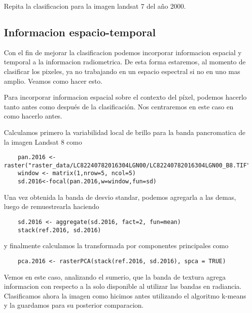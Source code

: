 \begin{act}
  Repita la clasificacion para la imagen landsat 7 del año 2000.
\end{act}


\subsection{Informacion espacio-temporal}
Con el fin de mejorar la clasificacion podemos incorporar informacion espacial y
temporal a la informacion radiometrica. De esta forma estaremos, al momento de
clasificar los pixeles, ya no trabajando en un espacio espectral si no en uno mas
amplio. Veamos como hacer esto.

\begin{exa}
  Para incorporar informacion espacial sobre el contexto del p\'ixel, podemos
  hacerlo tanto antes como despu\'es de la clasificaci\'on. Nos centraremos
  en este caso en como hacerlo antes.

  Calculamos primero la variabilidad local de brillo para la banda pancromatica
  de la imagen Landsat 8 como

  \begin{lstlisting}
    pan.2016 <- raster("raster_data/LC82240782016304LGN00/LC82240782016304LGN00_B8.TIF")
    window <- matrix(1,nrow=5, ncol=5)
    sd.2016<-focal(pan.2016,w=window,fun=sd)
  \end{lstlisting}

  Una vez obtenida la banda de desvio standar, podemos agregarla a las demas, luego
  de remuestrearla haciendo

  \begin{lstlisting}
    sd.2016 <- aggregate(sd.2016, fact=2, fun=mean)
    stack(ref.2016, sd.2016)
  \end{lstlisting}

  y finalmente calculamos la transformada por componentes principales como

  \begin{lstlisting}
    pca.2016 <- rasterPCA(stack(ref.2016, sd.2016), spca = TRUE)
  \end{lstlisting}

  Vemos en este caso, analizando el sumerio, que la banda de textura agrega informacion
  con respecto a la solo disponible al utilizar las bandas en radiancia. Clasificamos
  ahora la imagen como hicimos antes utilizando el algoritmo k-means y la guardamos para
  su posterior comparacion.
\end{exa}

